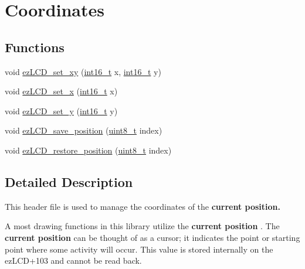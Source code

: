 \hypertarget{group__ez_l_c_d__103__coordinates}{\section{Coordinates}
\label{group__ez_l_c_d__103__coordinates}
}
\subsection*{Functions}
\begin{DoxyCompactItemize}
\item 
void \hyperlink{group__ez_l_c_d__103__coordinates_ga7622b9ff8ad99e99896043bb859812ba}{ez\-L\-C\-D\-\_\-set\-\_\-xy} (\hyperlink{group__ez_l_c_d__103__common_ga932e6ccc3d54c58f761c1aead83bd6d7}{int16\-\_\-t} x, \hyperlink{group__ez_l_c_d__103__common_ga932e6ccc3d54c58f761c1aead83bd6d7}{int16\-\_\-t} y)
\item 
void \hyperlink{group__ez_l_c_d__103__coordinates_gaf9f5252984333f1d720f7f2af8717a78}{ez\-L\-C\-D\-\_\-set\-\_\-x} (\hyperlink{group__ez_l_c_d__103__common_ga932e6ccc3d54c58f761c1aead83bd6d7}{int16\-\_\-t} x)
\item 
void \hyperlink{group__ez_l_c_d__103__coordinates_ga2dbe19082766cc06a2cf2f9e3af832b6}{ez\-L\-C\-D\-\_\-set\-\_\-y} (\hyperlink{group__ez_l_c_d__103__common_ga932e6ccc3d54c58f761c1aead83bd6d7}{int16\-\_\-t} y)
\item 
void \hyperlink{group__ez_l_c_d__103__coordinates_ga43e326c735abcb1fb21e13e8027d0192}{ez\-L\-C\-D\-\_\-save\-\_\-position} (\hyperlink{group__ez_l_c_d__103__common_gaba7bc1797add20fe3efdf37ced1182c5}{uint8\-\_\-t} index)
\item 
void \hyperlink{group__ez_l_c_d__103__coordinates_gab324a4b083ce8031560b017cf340e52d}{ez\-L\-C\-D\-\_\-restore\-\_\-position} (\hyperlink{group__ez_l_c_d__103__common_gaba7bc1797add20fe3efdf37ced1182c5}{uint8\-\_\-t} index)
\end{DoxyCompactItemize}


\subsection{Detailed Description}
This header file is used to manage the coordinates of the {\bfseries  current position. }

A most drawing functions in this library utilize the {\bfseries current position }. The {\bfseries current position } can be thought of as a cursor; it indicates the point or starting point where some activity will occur. This value is stored internally on the ez\-L\-C\-D+103 and cannot be read back.

